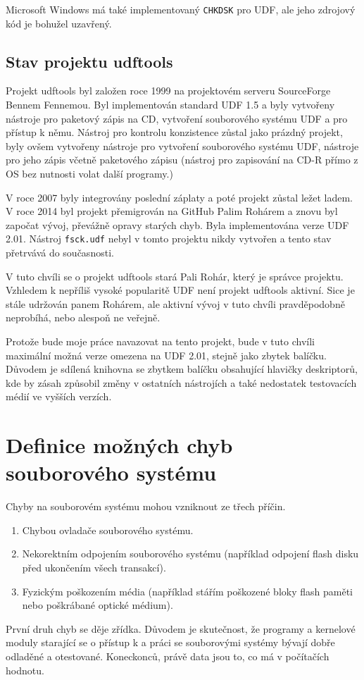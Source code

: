 Microsoft Windows má také implementovaný \texttt{CHKDSK} pro UDF, ale jeho zdrojový kód je bohužel uzavřený.


\section{Stav projektu udftools}
\label{sec:stav-udftools}
Projekt udftools byl založen roce 1999 na projektovém serveru SourceForge \cite{udftools-sourceforge} Bennem Fennemou. Byl implementován standard UDF 1.5 a byly vytvořeny nástroje pro paketový zápis na CD, vytvoření souborového systému UDF a pro přístup k němu. Nástroj pro kontrolu konzistence zůstal jako prázdný projekt, byly ovšem vytvořeny nástroje pro vytvoření souborového systému UDF, nástroje pro jeho zápis včetně paketového zápisu (nástroj pro zapisování na CD-R přímo z OS bez nutnosti volat další programy.)

V roce 2007 byly integrovány poslední záplaty a poté projekt zůstal ležet ladem. V roce 2014 byl projekt přemigrován na GitHub \cite{udftools-github} Palim Rohárem a znovu byl započat vývoj, převážně opravy starých chyb. Byla implementována verze UDF 2.01. Nástroj \texttt{fsck.udf} nebyl v tomto projektu nikdy vytvořen a tento stav přetrvává do současnosti.

V tuto chvíli se o projekt udftools stará Pali Rohár, který je správce projektu. Vzhledem k nepříliš vysoké popularitě UDF není projekt udftools aktivní. Sice je stále udržován panem Rohárem, ale aktivní vývoj v tuto chvíli pravděpodobně neprobíhá, nebo alespoň ne veřejně.

Protože bude moje práce navazovat na tento projekt, bude v tuto chvíli maximální možná verze omezena na UDF 2.01, stejně jako zbytek balíčku. Důvodem je sdílená knihovna se zbytkem balíčku obsahující hlavičky deskriptorů, kde by zásah způsobil změny v ostatních nástrojích a také nedostatek testovacích médií ve vyšších verzích.

\chapter{Definice možných chyb souborového systému}
\label{ch:definice-chyb}
Chyby na souborovém systému mohou vzniknout ze třech příčin. 
\begin{enumerate}
    \item Chybou ovladače souborového systému.
    \item Nekorektním odpojením souborového systému (například odpojení flash disku před ukončením všech transakcí).
    \item Fyzickým poškozením média (například stářím poškozené bloky flash paměti nebo poškrábané optické médium).
\end{enumerate}
První druh chyb se děje zřídka. Důvodem je skutečnost, že programy a kernelové moduly starající se o přístup k a práci se souborovými systémy bývají dobře odladěné a otestované. Koneckonců, právě data jsou to, co má v počítačích hodnotu.

